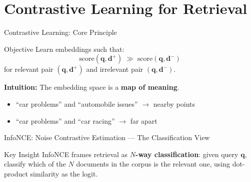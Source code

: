 \documentclass[aspectratio=169]{beamer}
\newif\ifanimated
\newcommand{\cpause}{\ifanimated\pause\fi}
\newcommand{\vq}{\mathbf{q}}
\newcommand{\vd}{\mathbf{d}}
\begin{document}
\section{Contrastive Learning for Retrieval}

\begin{frame}[plain]
\sectionpage
\end{frame}

\begin{frame}[shrink=15]{Contrastive Learning: Core Principle}
\begin{block}{Objective}
Learn embeddings such that:
$$\text{score}(\vq, \vd^+) \;\gg\; \text{score}(\vq, \vd^-)$$
for relevant pair $(\vq, \vd^+)$ and irrelevant pair $(\vq, \vd^-)$.
\end{block}

\cpause
\vspace{0.5em}

\textbf{Intuition:} The embedding space is a \textbf{map of meaning}.
\begin{itemize}
    \item ``car problems'' and ``automobile issues'' $\to$ nearby points
    \item ``car problems'' and ``car racing'' $\to$ far apart
\end{itemize}\cpause


\end{frame}

\begin{frame}[shrink=20]{InfoNCE: Noise Contrastive Estimation --- The Classification View}
\begin{center}

\end{center}

\begin{exampleblock}{Key Insight}
InfoNCE frames retrieval as \textbf{$N$-way classification}: given query $\vq$, classify which of the $N$ documents in the corpus is the relevant one, using dot-product similarity as the logit.
\end{exampleblock}
\end{frame}
\end{document}
